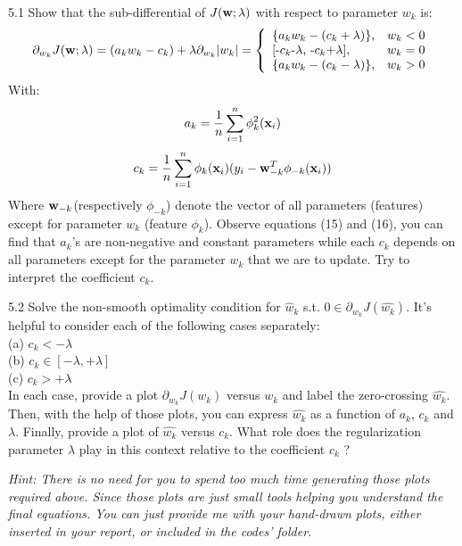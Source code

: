 \documentclass{article}
\theoremstyle{definition}
\theoremstyle{definition}
\theoremstyle{remark}
\begin{document}
5.1 Show that the sub-differential of $J(\bold{w};\lambda)$ with respect to parameter $w_{k}$ is:
\begin{displaymath}
\partial_{w_{k}}J(\bold{w};\lambda)=(a_{k}w_{k}-c_{k})+\lambda\partial_{w_{k}}|w_{k}| =\left\{ \begin{array}{ll}
\{a_{k}w_{k}-(c_{k}+\lambda)\}, & \textrm{$w_{k}<0$} \\
$[-$c_{k}$-$\lambda$, -$c_{k}$+$\lambda$]$, & \textrm{$w_{k}=0$} \\
\{a_{k}w_{k}-(c_{k}-\lambda)\}, & \textrm{$w_{k}>0$}
\end{array} \right.
\end{displaymath}
With:
\begin{eqnarray}
a_{k}=\frac{1}{n}\sum_{i=1}^{n}\phi_{k}^{2}(\bold{x}_{i})
\end{eqnarray}
\begin{eqnarray}
c_{k}=\frac{1}{n}\sum_{i=1}^{n}\phi_{k}(\bold{x}_{i})(y_{i}-\bold{w}_{-k}^{T}\phi_{-k}(\bold{x}_{i}))
\end{eqnarray}
Where $\bold{w}_{-k}$(respectively $\phi_{-k}$) denote the vector of all parameters (features) except for parameter $w_{k}$ (feature $\phi_{k}$). Observe equations (15) and (16), you can find that $a_{k}$'s are non-negative and constant parameters while each $c_{k}$ depends on all parameters except for the parameter $w_{k}$ that we are to update. Try to interpret the coefficient $c_{k}$.

5.2 Solve the non-smooth optimality condition for $\hat{w}_{k}$ s.t. $0 \in \partial_{w_{k}}J(\hat{w_{k}})$. It's helpful to consider each of the following cases separately: \\
\qquad\qquad (a) $c_{k}<-\lambda$\\
\qquad\qquad (b) $c_{k}\in [-\lambda, +\lambda]$\\
\qquad\qquad (c) $c_{k}>+\lambda$\\
In each case, provide a plot $\partial_{w_{k}}J(w_{k})$ versus $w_{k}$ and label the zero-crossing $\hat{w_{k}}$. Then, with the help of those plots, you can express $\hat{w_{k}}$ as a function of $a_{k}$, $c_{k}$ and $\lambda$. Finally, provide a plot of $\hat{w_{k}}$ versus $c_{k}$. What role does the regularization parameter $\lambda$ play in this context relative to the coefficient $c_{k}$ ?

\emph{Hint: There is no need for you to spend too much time generating those plots required above. Since those plots are just small tools helping you understand the final equations. You can just provide me with your hand-drawn plots, either inserted in your report, or included in the codes' folder.}
\end{document}
